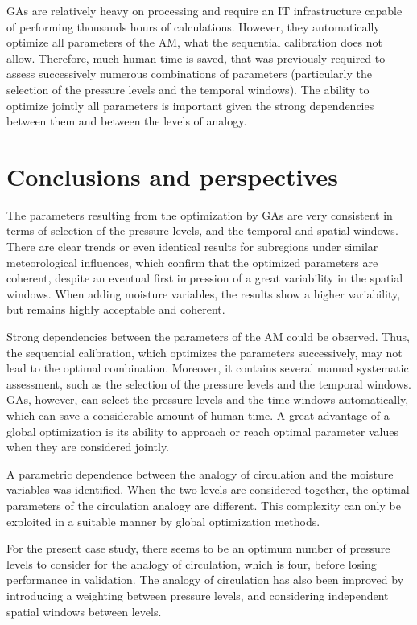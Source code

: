 \documentclass[5p]{elsarticle}
\begin{document}
GAs are relatively heavy on processing and require an IT infrastructure capable of performing thousands hours of calculations. However, they automatically optimize all parameters of the AM, what the sequential calibration does not allow. Therefore, much human time is saved, that was previously required to assess successively numerous combinations of parameters (particularly the selection of the pressure levels and the temporal windows). The ability to optimize jointly all parameters is important given the strong dependencies between them and between the levels of analogy.


\section{Conclusions and perspectives}
\label{sec:conclusions}


The parameters resulting from the optimization by GAs are very consistent in terms of selection of the pressure levels, and the temporal and spatial windows. There are clear trends or even identical results for subregions under similar meteorological influences, which confirm that the optimized parameters are coherent, despite an eventual first impression of a great variability in the spatial windows. When adding moisture variables, the results show a higher variability, but remains highly acceptable and coherent.

Strong dependencies between the parameters of the AM could be observed. Thus, the sequential calibration, which optimizes the parameters successively, may not lead to the optimal combination. Moreover, it contains several manual systematic assessment, such as the selection of the pressure levels and the temporal windows. GAs, however, can select the pressure levels and the time windows automatically, which can save a considerable amount of human time. A great advantage of a global optimization is its ability to approach or reach optimal parameter values when they are considered jointly. 

A parametric dependence between the analogy of circulation and the moisture variables was identified. When the two levels are considered together, the optimal parameters of the circulation analogy are different. This complexity can only be exploited in a suitable manner by global optimization methods.

For the present case study, there seems to be an optimum number of pressure levels to consider for the analogy of circulation, which is four, before losing performance in validation. The analogy of circulation has also been improved by introducing a weighting between pressure levels, and considering independent spatial windows between levels.
\end{document}
